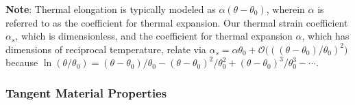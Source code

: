 \textbf{Note}: Thermal elongation is typically modeled as $\alpha (\theta - \theta_0)$, wherein $\alpha$ is referred to as the coefficient for thermal expansion.  Our thermal strain coefficient $\alpha_s$, which is dimensionless, and the coefficient for thermal expansion $\alpha$, which has dimensions of reciprocal temperature, relate via $\alpha_s = \alpha \theta_0 + \mathcal{O}\bigl( ((\theta - \theta_0) / \theta_0)^2 \bigr)$ because $\ln ( \theta / \theta_0 ) = (\theta - \theta_0) / \theta_0 - (\theta - \theta_0)^2 / \theta_0^2 + (\theta - \theta_0)^3 / \theta_0^3 - \cdots$.

\subsubsection{Tangent Material Properties}

